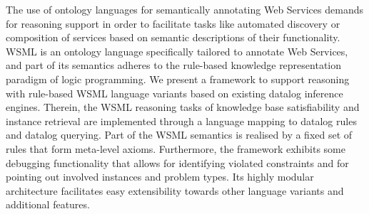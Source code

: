 The use of ontology languages for semantically annotating Web
Services demands for reasoning support in order to facilitate
tasks like automated discovery or composition of services based on
semantic descriptions of their functionality. WSML is an ontology
language specifically tailored to annotate Web Services, and part
of its semantics adheres to the rule-based knowledge
representation paradigm of logic programming. We present a
framework to support reasoning with rule-based WSML language
variants based on existing datalog inference engines. Therein, the
WSML reasoning tasks of knowledge base satisfiability and instance
retrieval are implemented through a language mapping to datalog
rules and datalog querying. Part of the WSML semantics is realised
by a fixed set of rules that form meta-level axioms. Furthermore,
the framework exhibits some debugging functionality that allows
for identifying violated constraints and for pointing out involved
instances and problem types. Its highly modular architecture
facilitates easy extensibility towards other language variants and
additional features.

